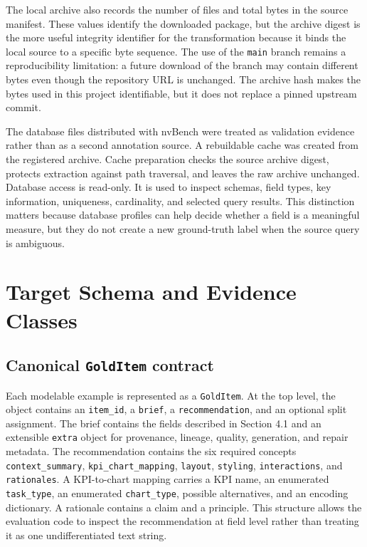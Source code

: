 The local archive also records the number of files and total bytes in the source manifest. These values identify the downloaded package, but the archive digest is the more useful integrity identifier for the transformation because it binds the local source to a specific byte sequence. The use of the \texttt{main} branch remains a reproducibility limitation: a future download of the branch may contain different bytes even though the repository URL is unchanged. The archive hash makes the bytes used in this project identifiable, but it does not replace a pinned upstream commit.

The database files distributed with nvBench were treated as validation evidence rather than as a second annotation source. A rebuildable cache was created from the registered archive. Cache preparation checks the source archive digest, protects extraction against path traversal, and leaves the raw archive unchanged. Database access is read-only. It is used to inspect schemas, field types, key information, uniqueness, cardinality, and selected query results. This distinction matters because database profiles can help decide whether a field is a meaningful measure, but they do not create a new ground-truth label when the source query is ambiguous.

\section{Target Schema and Evidence Classes}

\subsection{\texorpdfstring{Canonical \texttt{GoldItem} contract}{Canonical GoldItem contract}}

Each modelable example is represented as a \texttt{GoldItem}. At the top level, the object contains an \texttt{item\_id}, a \texttt{brief}, a \texttt{recommendation}, and an optional split assignment. The brief contains the fields described in Section 4.1 and an extensible \texttt{extra} object for provenance, lineage, quality, generation, and repair metadata. The recommendation contains the six required concepts \texttt{context\_summary}, \texttt{kpi\_chart\_mapping}, \texttt{layout}, \texttt{styling}, \texttt{interactions}, and \texttt{rationales}. A KPI-to-chart mapping carries a KPI name, an enumerated \texttt{task\_type}, an enumerated \texttt{chart\_type}, possible alternatives, and an encoding dictionary. A rationale contains a claim and a principle. This structure allows the evaluation code to inspect the recommendation at field level rather than treating it as one undifferentiated text string.

